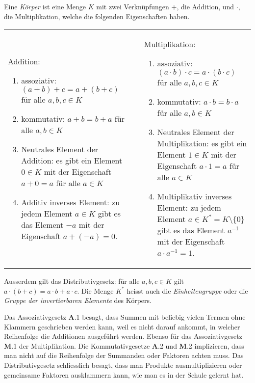 \begin{definition}
\label{buch:integral:definition:koerper}
Eine {\em Körper} ist eine Menge $K$ mit zwei Verknüpfungen $+$, die Addition,
und $\cdot$, die Multiplikation,
welche die folgenden Eigenschaften haben.
\begin{center}
\renewcommand{\tabcolsep}{0pt}
\begin{tabular}{p{68mm}p{4mm}p{68mm}}
Addition:
\begin{enumerate}[{\bf A}.1)]
\item assoziativ: $(a+b)+c=a+(b+c)$
für alle $a,b,c\in K$
\item kommutativ: $a+b=b+a$
für alle $a,b\in K$
\item Neutrales Element der Addition: es gibt ein Element $0\in K$ mit
der Eigenschaft $a+0=a$ für alle $a\in K$
\item Additiv inverses Element: zu jedem Element $a\in K$ gibt es das Element
$-a$ mit der Eigenschaft $a+(-a)=0$.
\end{enumerate}
&&%
Multiplikation:
\begin{enumerate}[{\bf M}.1)]
\item assoziativ: $(a\cdot b)\cdot c=a\cdot (b\cdot c)$
für alle $a,b,c\in K$
\index{Assoziativgesetz}%
\index{assoziativ}%
\item kommutativ: $a\cdot b=b\cdot a$
für alle $a,b\in K$
\index{Kommutativgesetz}%
\index{kommutativ}%
\item Neutrales Element der Multiplikation: es gibt ein Element $1\in K$ mit
der Eigenschaft $a\cdot 1 =a$ für alle $a\in K$
\index{neutrales Element}%
\item Multiplikativ inverses Element: zu jedem Element
\index{inverses Element}%
$a\in K^*=K\setminus\{0\}$
gibt es das Element $a^{-1}$ mit der Eigenschaft $a\cdot a^{-1}=1$.
\index{Einheitengruppe}%
\index{Gruppe der invertierbaren Elemente}%
\end{enumerate}
\end{tabular}
\end{center}
Ausserdem gilt das Distributivgesetz: für alle $a,b,c\in K$ gilt
$a\cdot(b+c)=a\cdot b + a\cdot c$.
%
Die Menge $K^*$ heisst auch die {\em Einheitengruppe} oder die
{\em Gruppe der invertierbaren Elemente} des Körpers.
\end{definition}

Das Assoziativgesetz {\bf A}.1 besagt, dass Summen mit beliebig
vielen Termen ohne Klammern geschrieben werden kann, weil es nicht
darauf ankommt, in welcher Reihenfolge die Additionen ausgeführt werden.
Ebenso für das Assoziativgesetz {\bf M}.1 der Multiplikation.
Die Kommutativgesetze {\bf A}.2 und {\bf M}.2 implizieren, dass man
nicht auf die Reihenfolge der Summanden oder Faktoren achten muss.
Das Distributivgesetz schliesslich besagt, dass man Produkte ausmultiplizieren
oder gemeinsame Faktoren ausklammern kann, wie man es in der Schule
gelernt hat.


